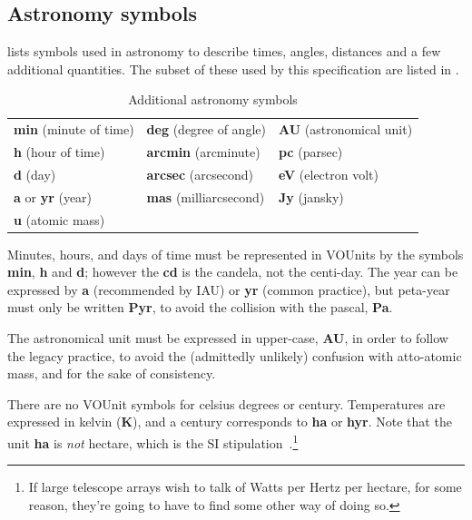 \documentclass[11pt,notitlepage,onecolumn]{ivoa}
\newcommand{\unit}[1]{\textbf{\textsf{\color{orange}#1}}}
\begin{document}
\subsection{Astronomy symbols}

 lists symbols used in astronomy to
describe times, angles, distances and a few additional quantities.
The subset of these used by this specification are
listed in .

\begin{table}[ht]
\begin{center}
\begin{tabular}{|l|l|l|}\hline
\unit{min} (minute of time)	&\unit{deg} (degree of angle) 	&\unit{AU} (astronomical unit)     	\\
\unit{h} (hour of time)		&\unit{arcmin} (arcminute)    	&\unit{pc} (parsec) 	\\
\unit{d} (day)			&\unit{arcsec} (arcsecond)  	&\unit{eV} (electron volt)	\\
\unit{a} or \unit{yr} (year)	&\unit{mas} (milliarcsecond)    &\unit{Jy} (jansky) 	\\
\unit{u} (atomic mass)		&      				&	\\\hline
\end{tabular}
\end{center}
\caption{\label{tab:vouadopted}Additional astronomy symbols}
\end{table}


Minutes, hours, and days of time must be represented in VOUnits by the
symbols \unit{min}, \unit{h} and \unit{d}; however the \unit{cd} is
the candela, not the centi-day.  The year can be expressed by \unit{a}
(recommended by IAU) or \unit{yr} (common practice), but peta-year
must only be written \unit{Pyr}, to avoid the collision with the
pascal, \unit{Pa}.

The astronomical unit must be expressed in upper-case, \unit{AU},
in order to follow the legacy practice, to avoid the (admittedly unlikely)
confusion with atto-atomic mass, and for the sake of consistency.

There are no VOUnit symbols for celsius degrees or century.
Temperatures are expressed in kelvin (\unit{K}),
and a century corresponds to \unit{ha} or \unit{hyr}. Note
that the unit \unit{ha} is \emph{not} hectare, which is the SI
stipulation~\citep{si-brochure}.\footnote{If large telescope arrays 
wish to talk of Watts per Hertz per hectare, for some reason, they're going
to have to find some other way of doing so.}
\end{document}
